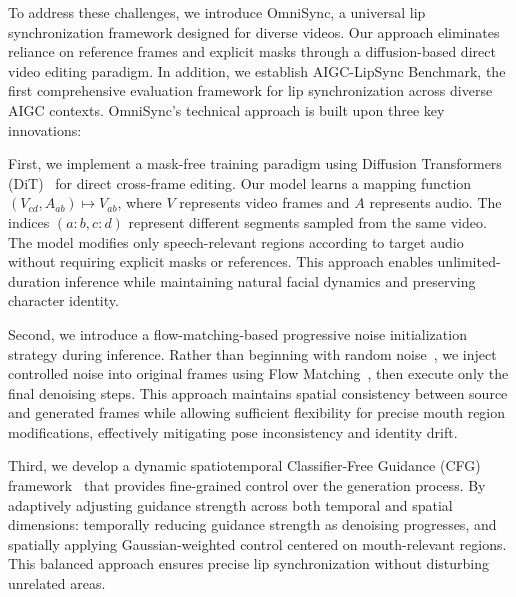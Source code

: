 To address these challenges, we introduce OmniSync, a universal lip synchronization framework designed for diverse videos. Our approach eliminates reliance on reference frames and explicit masks through a diffusion-based direct video editing paradigm. In addition, we establish AIGC-LipSync Benchmark, the first comprehensive evaluation framework for lip synchronization across diverse AIGC contexts. OmniSync's technical approach is built upon three key innovations:

First, we implement a mask-free training paradigm using Diffusion Transformers (DiT)~\cite{peebles2023scalable} for direct cross-frame editing. Our model learns a mapping function $(V_{cd}, A_{ab}) \mapsto V_{ab}$, where $V$ represents video frames and $A$ represents audio. The indices $(a:b, c:d)$ represent different segments sampled from the same video. The model modifies only speech-relevant regions according to target audio without requiring explicit masks or references. This approach enables unlimited-duration inference while maintaining natural facial dynamics and preserving character identity.


Second, we introduce a flow-matching-based progressive noise initialization strategy during inference. Rather than beginning with random noise~\cite{tian2024emo}, we inject controlled noise into original frames using Flow Matching~\cite{lipman2022flow}, then execute only the final denoising steps. This approach maintains spatial consistency between source and generated frames while allowing sufficient flexibility for precise mouth region modifications, effectively mitigating pose inconsistency and identity drift.

Third, we develop a dynamic spatiotemporal Classifier-Free Guidance (CFG) framework~\cite{ho2022classifier} that provides fine-grained control over the generation process. By adaptively adjusting guidance strength across both temporal and spatial dimensions: temporally reducing guidance strength as denoising progresses, and spatially applying Gaussian-weighted control centered on mouth-relevant regions. This balanced approach ensures precise lip synchronization without disturbing unrelated areas.


